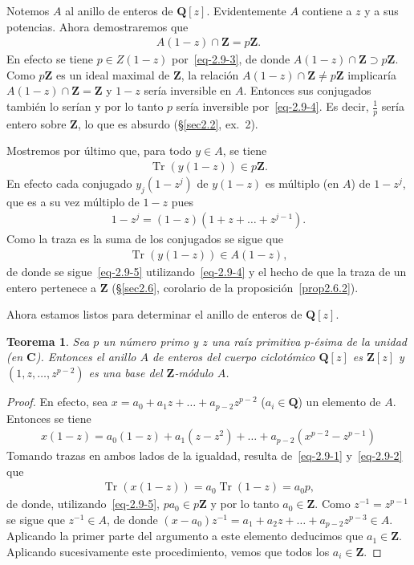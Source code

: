 \documentclass[10pt,oneside,bibtotoc,smallheadings,leqno,a5paper,DIV=12]{scrbook}
\newcommand{\QQ}{\mathbf{Q}}
\newcommand{\ZZ}{\mathbf{Z}}
\newcommand{\CC}{\mathbf{C}}
\newcommand{\QED}{}%
\DeclareMathOperator{\Tr}{Tr}
\numberwithin{equation}{section}
\theoremstyle{defi}
\theoremstyle{enonce}
\newtheorem{theorem}{Teorema}
\theoremstyle{rem}
\numberwithin{theorem}{section}
\numberwithin{proposition}{section}
\numberwithin{definition}{section}
\numberwithin{lemma}{section}
\numberwithin{corollary}{section}
\numberwithin{example}{section}
\numberwithin{footnote}{section}%
\begin{document}
Notemos $A$ al anillo de enteros de $\QQ[z]$. Evidentemente $A$ contiene a $z$ y a sus potencias. Ahora
demostraremos que
\begin{gather}\label{eq-2.9-4}
A(1-z)\cap\ZZ = p\ZZ.
\end{gather}
En efecto se tiene $p\in Z(1-z)$ por~\eqref{eq-2.9-3}, de donde $A(1-z)\cap\ZZ\supset p\ZZ$. Como $p\ZZ$
es un ideal maximal de $\ZZ$, la relaci\'on $A(1-z)\cap\ZZ\neq p\ZZ$ implicar\'ia $A(1-z)\cap\ZZ=\ZZ$ y
$1-z$ ser\'ia inversible en $A$. Entonces sus conjugados tambi\'en lo ser\'ian y por lo tanto $p$ ser\'ia
inversible por~\eqref{eq-2.9-4}. Es decir, $\frac{1}{p}$ ser\'ia entero sobre $\ZZ$, lo que es absurdo
(\S\ref{sec2.2}, ex.~2).

Mostremos por \'ultimo que, para todo $y\in A$, se tiene
\begin{gather}\label{eq-2.9-5}
\Tr(y(1-z))\in p\ZZ.
\end{gather}
En efecto cada conjugado $y_{j}(1-z^{j})$ de $y(1-z)$ es m\'ultiplo (en $A$) de $1-z^{j}$, que es a su
vez m\'ultiplo de $1-z$ pues
\begin{gather*}
1-z^{j} = (1-z)(1+z+\dots+z^{j-1}).
\end{gather*}
Como la traza es la suma de los conjugados se sigue que
\begin{gather*}
\Tr(y(1-z))\in A(1-z),
\end{gather*}
de donde se sigue~\eqref{eq-2.9-5} utilizando~\eqref{eq-2.9-4} y el hecho de que la traza de un entero
pertenece a $\ZZ$ (\S\ref{sec2.6}, corolario de la proposici\'on~\ref{prop2.6.2}).

Ahora estamos listos para determinar el anillo de enteros de $\QQ[z]$.

\begin{theorem}\label{teo2.9.2}
Sea $p$ un n\'umero primo y $z$ una ra\'iz primitiva $p$-\'esima de la unidad (en $\CC$). Entonces el
anillo $A$ de enteros del cuerpo ciclot\'omico $\QQ[z]$ es $\ZZ[z]$ y $(1,z,\dots,z^{p-2})$ es una base
del $\ZZ$-m\'odulo $A$.
\end{theorem}

\begin{proof}
En efecto, sea $x = a_{0}+a_{1}z+\dots+a_{p-2}z^{p-2}$ ($a_{i}\in\QQ$) un elemento de $A$. Entonces
se tiene
\begin{gather*}
x(1-z) = a_{0}(1-z)+a_{1}(z-z^{2})+\dots+a_{p-2}(x^{p-2}-z^{p-1})
\end{gather*}
Tomando trazas en ambos lados de la igualdad, resulta de~\eqref{eq-2.9-1} y~\eqref{eq-2.9-2} que
\begin{gather*}
\Tr(x(1-z)) = a_{0}\Tr(1-z)=a_{0}p,
\end{gather*}
de donde, utilizando~\eqref{eq-2.9-5}, $pa_{0}\in p\ZZ$ y por lo tanto $a_{0}\in\ZZ$. Como
$z^{-1}=z^{p-1}$ se sigue que $z^{-1}\in A$, de donde $(x-a_{0})z^{-1}=a_{1}+a_{2}z+\dots+a_{p-2}z^{p-3}\in A$.
Aplicando la primer parte del argumento a este elemento deducimos que $a_{1}\in\ZZ$. Aplicando sucesivamente
este procedimiento, vemos que todos los $a_{i}\in\ZZ$. \QED
\end{proof}
\end{document}
